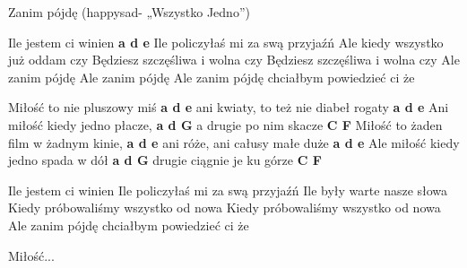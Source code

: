 \documentclass[../../../songbook.tex]{subfiles}
\begin{document}
Zanim pójdę
(happysad- „Wszystko Jedno”)

Ile jestem ci winien				\textbf{a d e} \newline
Ile policzyłaś mi za swą przyjaźń			\newline
Ale kiedy wszystko już oddam czy 			\newline
Będziesz szczęśliwa i wolna czy 			\newline
Będziesz szczęśliwa i wolna czy 			\newline
Ale zanim pójdę 					        \newline
Ale zanim pójdę 					        \newline
Ale zanim pójdę chciałbym powiedzieć ci że	\newline	  

Miłość to nie pluszowy miś				\textbf{a d e} \newline
ani kwiaty, to też nie diabeł rogaty 	\textbf{a d e} \newline
Ani miłość kiedy jedno płacze,			\textbf{a d G} \newline
a drugie po nim skacze					\textbf{C F}   \newline
Miłość to żaden film w żadnym kinie, 	\textbf{a d e} \newline
ani róże, ani całusy małe duże 			\textbf{a d e} \newline
Ale miłość kiedy jedno spada w dół  	\textbf{a d G} \newline
drugie ciągnie je ku górze  			\textbf{C F}   \newline

Ile jestem ci winien                        \newline
Ile policzyłaś mi za swą przyjaźń           \newline
Ile były warte nasze słowa                  \newline
Kiedy próbowaliśmy wszystko od nowa         \newline
Kiedy próbowaliśmy wszystko od nowa         \newline
Ale zanim pójdę chciałbym powiedzieć ci że  \newline

Miłość...
\end{document}
